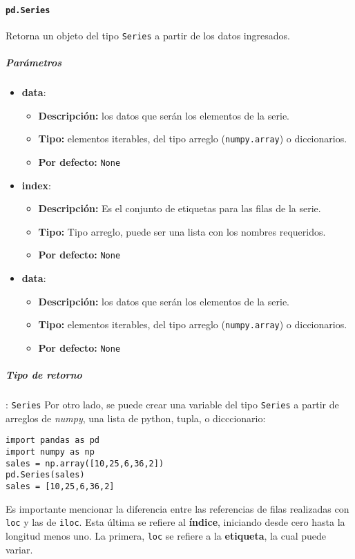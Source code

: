 \paragraph{\texttt{pd.Series}} Retorna un objeto del tipo \texttt{Series} a partir de los datos ingresados.
\subparagraph{Parámetros}
\begin{itemize}
\item \textbf{data}:
\begin{itemize}
\item \textbf{Descripción:} los datos que serán los elementos de la serie.
\item \textbf{Tipo:} elementos iterables, del tipo arreglo (\texttt{numpy.array}) o diccionarios.
\item \textbf{Por defecto:} \texttt{None} 
\end{itemize}
\item \textbf{index}:
\begin{itemize}
\item \textbf{Descripción:} Es el conjunto de etiquetas para las filas de la serie.
\item \textbf{Tipo:} Tipo arreglo, puede ser una lista con los nombres requeridos.
\item \textbf{Por defecto:} \texttt{None} 
\end{itemize}
\item \textbf{data}:
\begin{itemize}
\item \textbf{Descripción:} los datos que serán los elementos de la serie.
\item \textbf{Tipo:} elementos iterables, del tipo arreglo (\texttt{numpy.array}) o diccionarios.
\item \textbf{Por defecto:} \texttt{None} 
\end{itemize}
\end{itemize}
\subparagraph{Tipo de retorno}: \texttt{Series}
Por otro lado, se puede crear una variable del tipo \texttt{Series} a partir de arreglos de \textit{numpy}, una lista de python, tupla, o dicccionario:
\begin{verbatim}
import pandas as pd
import numpy as np
sales = np.array([10,25,6,36,2])
pd.Series(sales)
sales = [10,25,6,36,2]
\end{verbatim}
Es importante mencionar la diferencia entre las referencias de filas realizadas con \texttt{loc} y las de \texttt{iloc}. Esta última se refiere al \textbf{índice}, iniciando desde cero hasta la longitud menos uno. La primera, \texttt{loc} se refiere a la \textbf{etiqueta}, la cual puede variar.

